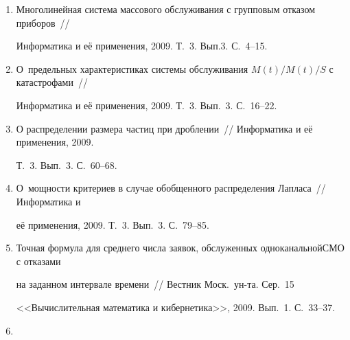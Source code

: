 \begin{enumerate}[1.]
С.~49--86.





\item {}


Многолинейная система массового обслуживания с групповым отказом приборов~// 


Информатика и её применения, 2009. Т.~3. Вып.3. С.~4--15.





\item {}


О~предельных характеристиках системы обслуживания $M(t)/M(t)/S$ с катастрофами~// 


Информатика и её применения, 2009. Т.~3. Вып.~3. С.~16--22.





\item {}


О распределении размера частиц при дроблении~// Информатика и её применения, 2009. 


Т.~3. Вып.~3. С.~60--68.





\item {}


О~мощности критериев в случае обобщенного распределения Лапласа~// Информатика и 


её применения, 2009. Т.~3. Вып.~3. С.~79--85.





\item {}


Точная формула для среднего числа заявок, обслуженных одноканальной\linebreak СМО с отказами 


на заданном интервале времени~// Вестник Моск.\ ун-та. Сер.~15 


<<Вычислительная математика и кибернетика>>, 2009. Вып.~1. С.~33--37.





\item {}



\end{enumerate}
